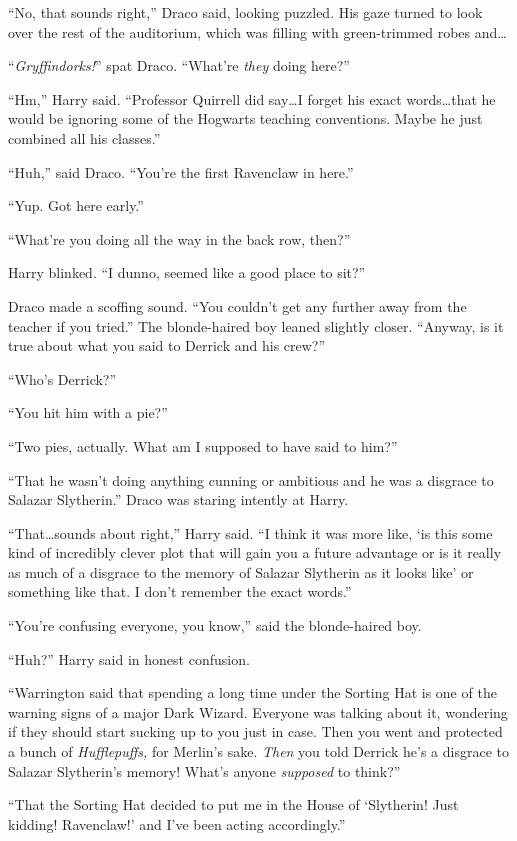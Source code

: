 “No, that sounds right,” Draco said, looking puzzled. His gaze turned to look over the rest of the auditorium, which was filling with green-trimmed robes and…

“\emph{Gryffindorks!}” spat Draco. “What’re \emph{they} doing here?”

“Hm,” Harry said. “Professor Quirrell did say…I forget his exact words…that he would be ignoring some of the Hogwarts teaching conventions. Maybe he just combined all his classes.”

“Huh,” said Draco. “You’re the first Ravenclaw in here.”

“Yup. Got here early.”

“What’re you doing all the way in the back row, then?”

Harry blinked. “I dunno, seemed like a good place to sit?”

Draco made a scoffing sound. “You couldn’t get any further away from the teacher if you tried.” The blonde-haired boy leaned slightly closer. “Anyway, is it true about what you said to Derrick and his crew?”

“Who’s Derrick?”

“You hit him with a pie?”

“Two pies, actually. What am I supposed to have said to him?”

“That he wasn’t doing anything cunning or ambitious and he was a disgrace to Salazar Slytherin.” Draco was staring intently at Harry.

“That…sounds about right,” Harry said. “I think it was more like, ‘is this some kind of incredibly clever plot that will gain you a future advantage or is it really as much of a disgrace to the memory of Salazar Slytherin as it looks like’ or something like that. I don’t remember the exact words.”

“You’re confusing everyone, you know,” said the blonde-haired boy.

“Huh?” Harry said in honest confusion.

“Warrington said that spending a long time under the Sorting Hat is one of the warning signs of a major Dark Wizard. Everyone was talking about it, wondering if they should start sucking up to you just in case. Then you went and protected a bunch of \emph{Hufflepuffs,} for Merlin’s sake. \emph{Then} you told Derrick he’s a disgrace to Salazar Slytherin’s memory! What’s anyone \emph{supposed} to think?”

“That the Sorting Hat decided to put me in the House of ‘Slytherin! Just kidding! Ravenclaw!’ and I’ve been acting accordingly.”

